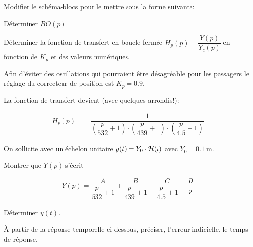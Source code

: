 \begin{Exo}[name={Devoir},title={Système de pendulation},origin={Adapté de Centrale MP 2000},label={exo:CentralePendulation}]
\Acompleter[6]


\qst Modifier le schéma-blocs pour le mettre sous la forme suivante:

{\centering
{}\par
}


\qst Déterminer $BO(p)$

\Acompleter[6]


\qst Déterminer la fonction de transfert en boucle fermée $H_p(p)=\dfrac{Y(p)}{Y_c(p)}$  en fonction de $K_p$  et des valeurs numériques.

\Acompleter[10]




Afin d'éviter des oscillations qui pourraient être désagréable pour les passagers  le réglage du correcteur de position est $K_p=\num{0.9}$.

La fonction de transfert devient (avec quelques arrondis!):

\begin{align*}
H_p(p)&=\dfrac{1}{\left(\dfrac{p}{532}+1\right)\cdot \left(\dfrac{p}{439}+1\right)\cdot\left (\dfrac{p}{4.5}+1\right)}
\end{align*}

On sollicite avec un échelon unitaire $y(t)=Y_0\cdot \mathcal {H}(t)$  avec $Y_0=\SI{0.1}{\metre}$.

\qst Montrer que $Y(p)$  s'écrit 

\begin{align*}
Y(p)= \dfrac{A}{\dfrac{p}{532}+1}+\dfrac{B}{\dfrac{p}{439}+1}+ \dfrac{C}{\dfrac{p}{4.5}+1} +\dfrac{D}{p}
\end{align*}

\Acompleter[12]


\qst Déterminer $y(t)$.

\Acompleter[12]


\qst À partir de la réponse temporelle ci-dessous, préciser, l'erreur indicielle, le temps de réponse.

{\centering
{}}
\end{Exo}
